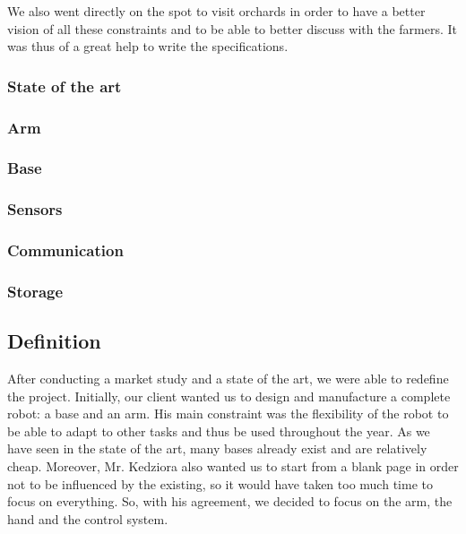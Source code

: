 \bigbreak

We also went directly on the spot to visit orchards in order to have a better vision of all these constraints and to be able to better discuss with the farmers. It was thus of a great help to write the specifications. 

\subsubsection{State of the art}

\subsubsection{Arm}

\subsubsection{Base}

\subsubsection{Sensors}

\subsubsection{Communication}

\subsubsection{Storage}

\subsection{Definition}

\hspace{\parindent} After conducting a market study and a state of the art, we were able to redefine the project. Initially, our client wanted us to design and manufacture a complete robot: a base and an arm. His main constraint was the flexibility of the robot to be able to adapt to other tasks and thus be used throughout the year. As we have seen in the state of the art, many bases already exist and are relatively cheap. Moreover, Mr. Kedziora also wanted us to start from a blank page in order not to be influenced by the existing, so it would have taken too much time to focus on everything. So, with his agreement, we decided to focus on the arm, the hand and the control system. 

